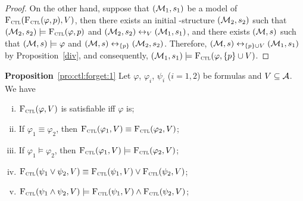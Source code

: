 \documentclass[letterpaper]{article} %
\begin{document}
\begin{proof}
On the other hand, suppose that $({\cal M}_1, s_1)$ be a model of ${\textsc{F}_{\textsc{ctl}}}({\textsc{F}_{\textsc{ctl}}}(\varphi, p), V)$, then there exists an initial \MPK-structure $({\cal M}_2, s_2)$ such that $({\cal M}_2, s_2) \models {\textsc{F}_{\textsc{ctl}}}(\varphi, p)$ and $({\cal M}_2, s_2) \leftrightarrow_V ({\cal M}_1, s_1)$, and there exists $({\cal M}, s)$ such that $({\cal M}, s) \models \varphi$ and $({\cal M}, s) \leftrightarrow_{\{p\}} ({\cal M}_2, s_2)$. Therefore, $({\cal M}, s) \leftrightarrow_{\{p\} \cup V} ({\cal M}_1, s_1)$ by Proposition~\ref{div}, and consequently, $({\cal M}_1, s_1) \models {\textsc{F}_{\textsc{ctl}}}(\varphi, \{p\} \cup V)$.
\end{proof}



\noindent\textbf{Proposition}~\ref{pro:ctl:forget:1}
Let $\varphi$, $\varphi_i$, $\psi_i$ ($i=1,2$) be formulas and $V\subseteq {\cal A}$. We have
\begin{enumerate}[(i)]
  \item ${\textsc{F}_{\textsc{ctl}}}(\varphi, V)$ is satisfiable iff $\varphi$ is;
  \item If $\varphi_1 \equiv \varphi_2$, then ${\textsc{F}_{\textsc{ctl}}}(\varphi_1, V) \equiv {\textsc{F}_{\textsc{ctl}}}(\varphi_2, V)$;
  \item If $\varphi_1 \models \varphi_2$, then ${\textsc{F}_{\textsc{ctl}}}(\varphi_1, V) \models {\textsc{F}_{\textsc{ctl}}}(\varphi_2, V)$;
  \item ${\textsc{F}_{\textsc{ctl}}}(\psi_1 \vee \psi_2, V) \equiv {\textsc{F}_{\textsc{ctl}}}(\psi_1, V) \vee {\textsc{F}_{\textsc{ctl}}}(\psi_2, V)$;
  \item ${\textsc{F}_{\textsc{ctl}}}(\psi_1 \wedge \psi_2, V) \models {\textsc{F}_{\textsc{ctl}}}(\psi_1, V) \wedge {\textsc{F}_{\textsc{ctl}}}(\psi_2, V)$;
\end{enumerate}
\end{document}

